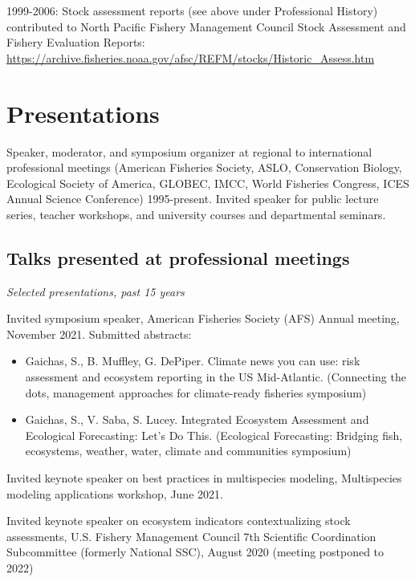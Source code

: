 \documentclass[11pt, a4paper]{awesome-cv}
\begin{document}
1999-2006: Stock assessment reports (see above under Professional
History) contributed to North Pacific Fishery Management Council Stock
Assessment and Fishery Evaluation Reports:
\url{https://archive.fisheries.noaa.gov/afsc/REFM/stocks/Historic_Assess.htm}

\hypertarget{presentations}{%
\section{Presentations}\label{presentations}}

Speaker, moderator, and symposium organizer at regional to international
professional meetings (American Fisheries Society, ASLO, Conservation
Biology, Ecological Society of America, GLOBEC, IMCC, World Fisheries
Congress, ICES Annual Science Conference) 1995-present. Invited speaker
for public lecture series, teacher workshops, and university courses and
departmental seminars.

\hypertarget{talks-presented-at-professional-meetings}{%
\subsection{Talks presented at professional
meetings}\label{talks-presented-at-professional-meetings}}

\emph{Selected presentations, past 15 years}

Invited symposium speaker, American Fisheries Society (AFS) Annual
meeting, November 2021. Submitted abstracts:

\begin{itemize}
\item
  Gaichas, S., B. Muffley, G. DePiper. Climate news you can use: risk
  assessment and ecosystem reporting in the US Mid-Atlantic. (Connecting
  the dots, management approaches for climate-ready fisheries symposium)
\item
  Gaichas, S., V. Saba, S. Lucey. Integrated Ecosystem Assessment and
  Ecological Forecasting: Let's Do This. (Ecological Forecasting:
  Bridging fish, ecosystems, weather, water, climate and communities
  symposium)
\end{itemize}

Invited keynote speaker on best practices in multispecies modeling,
Multispecies modeling applications workshop, June 2021.

Invited keynote speaker on ecosystem indicators contextualizing stock
assessments, U.S. Fishery Management Council 7th Scientific Coordination
Subcommittee (formerly National SSC), August 2020 (meeting postponed to
2022)
\end{document}

